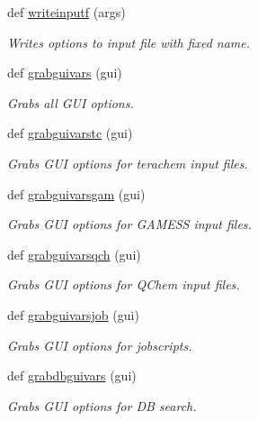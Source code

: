 \begin{DoxyCompactItemize}
def \hyperlink{namespacemolSimplify_1_1Scripts_1_1grabguivars_a63b7dc162860e01a8b1b732bf990fb7c}{writeinputf} (args)
\begin{DoxyCompactList}\small\item\em Writes options to input file with fixed name. \end{DoxyCompactList}\item 
def \hyperlink{namespacemolSimplify_1_1Scripts_1_1grabguivars_abec314e15ec84e9528e7efa942559cce}{grabguivars} (gui)
\begin{DoxyCompactList}\small\item\em Grabs all G\+UI options. \end{DoxyCompactList}\item 
def \hyperlink{namespacemolSimplify_1_1Scripts_1_1grabguivars_a5a9325c49daea993b7abe3e5f2ea828e}{grabguivarstc} (gui)
\begin{DoxyCompactList}\small\item\em Grabs G\+UI options for terachem input files. \end{DoxyCompactList}\item 
def \hyperlink{namespacemolSimplify_1_1Scripts_1_1grabguivars_ab489c45fcb00c2a8e9bbad48ab210770}{grabguivarsgam} (gui)
\begin{DoxyCompactList}\small\item\em Grabs G\+UI options for G\+A\+M\+E\+SS input files. \end{DoxyCompactList}\item 
def \hyperlink{namespacemolSimplify_1_1Scripts_1_1grabguivars_afd2a87d614162a4c7f3fe0abc32a8bde}{grabguivarsqch} (gui)
\begin{DoxyCompactList}\small\item\em Grabs G\+UI options for Q\+Chem input files. \end{DoxyCompactList}\item 
def \hyperlink{namespacemolSimplify_1_1Scripts_1_1grabguivars_afa035ac059800b0182e88958bc72e807}{grabguivarsjob} (gui)
\begin{DoxyCompactList}\small\item\em Grabs G\+UI options for jobscripts. \end{DoxyCompactList}\item 
def \hyperlink{namespacemolSimplify_1_1Scripts_1_1grabguivars_a4c50a9abcb313dc01c842d88a193bf57}{grabdbguivars} (gui)
\begin{DoxyCompactList}\small\item\em Grabs G\+UI options for DB search. \end{DoxyCompactList}\item 

\end{DoxyCompactItemize}
